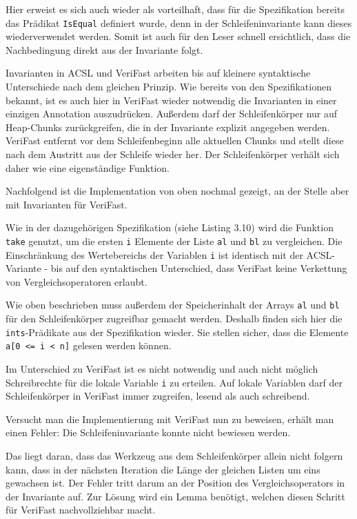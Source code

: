 Hier erweist es sich auch wieder als vorteilhaft, dass für die Spezifikation bereits das Prädikat
\lstinline{IsEqual} definiert wurde, denn in der Schleifeninvariante kann dieses wiederverwendet werden. Somit
ist auch für den Leser schnell ersichtlich, dass die Nachbedingung direkt aus der Invariante folgt.

Invarianten in ACSL und VeriFast arbeiten bis auf kleinere syntaktische Unterschiede nach dem gleichen Prinzip.
Wie bereits von den Spezifikationen bekannt, ist es auch hier in VeriFast wieder notwendig die Invarianten in 
einer einzigen Annotation auszudrücken. Außerdem darf der Schleifenkörper nur auf Heap-Chunks zurückgreifen, die
in der Invariante explizit angegeben werden. VeriFast entfernt vor dem Schleifenbeginn alle aktuellen Chunks
und stellt diese nach dem Austritt aus der Schleife wieder her. Der Schleifenkörper verhält sich daher
wie eine eigenständige Funktion.

\pagebreak
Nachfolgend ist die Implementation von oben nochmal gezeigt, an der Stelle aber mit Invarianten für VeriFast.



Wie in der dazugehörigen Spezifikation (siehe Listing 3.10) wird die Funktion \lstinline{take} genutzt,
um die ersten \lstinline{i} Elemente der Liste \lstinline{al} und \lstinline{bl} zu vergleichen.
Die Einschränkung des Wertebereichs der Variablen \lstinline{i} ist identisch mit der ACSL-Variante -
bis auf den syntaktischen Unterschied, dass VeriFast keine Verkettung von Vergleichsoperatoren erlaubt.

Wie oben beschrieben muss außerdem der Speicherinhalt der Arrays \lstinline{al} und \lstinline{bl} für
den Schleifenkörper zugreifbar gemacht werden. Deshalb finden sich hier die \lstinline{ints}-Prädikate
aus der Spezifikation wieder. Sie stellen sicher, dass die Elemente \lstinline{a[0 <= i < n]} gelesen
werden können.

Im Unterschied zu VeriFast ist es nicht notwendig und auch nicht möglich Schreibrechte für die lokale Variable 
\lstinline{i} zu erteilen. Auf lokale Variablen darf der Schleifenkörper in VeriFast immer zugreifen, lesend
als auch schreibend.

Versucht man die Implementierung mit VeriFast nun zu beweisen, erhält man einen Fehler: Die Schleifeninvariante
konnte nicht bewiesen werden.

Das liegt daran, dass das Werkzeug aus dem Schleifenkörper allein nicht folgern kann, dass in der nächsten Iteration 
die Länge der gleichen Listen um eins gewachsen ist. Der Fehler tritt darum an der Position des Vergleichsoperators in
der Invariante auf. Zur Lösung wird ein Lemma benötigt, welchen diesen Schritt für VeriFast nachvollziehbar macht.



